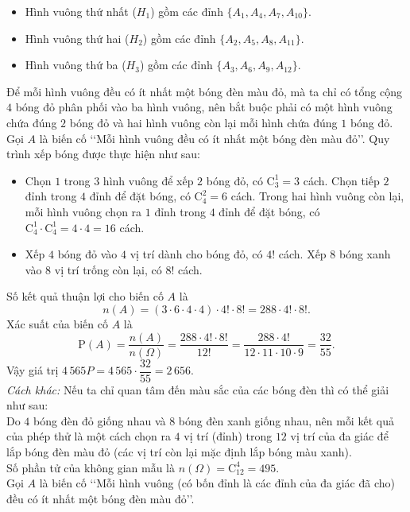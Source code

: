 \begin{ex}
{\begin{itemize}
			\item Hình vuông thứ nhất ($H_1$) gồm các đỉnh $\{A_1, A_4, A_7, A_{10}\}$.
			\item Hình vuông thứ hai ($H_2$) gồm các đỉnh $\{A_2, A_5, A_8, A_{11}\}$.
			\item Hình vuông thứ ba ($H_3$) gồm các đỉnh $\{A_3, A_6, A_9, A_{12}\}$.
		\end{itemize}
		Để mỗi hình vuông đều có ít nhất một bóng đèn màu đỏ, mà ta chỉ có tổng cộng $4$ bóng đỏ phân phối vào ba hình vuông, nên bắt buộc phải có một hình vuông chứa đúng $2$ bóng đỏ và hai hình vuông còn lại mỗi hình chứa đúng $1$ bóng đỏ.\\
		Gọi $A$ là biến cố \lq\lq Mỗi hình vuông đều có ít nhất một bóng đèn màu đỏ\rq\rq. Quy trình xếp bóng được thực hiện như sau:
		\begin{itemize}
			\item {}
			Chọn $1$ trong $3$ hình vuông để xếp $2$ bóng đỏ, có $\mathrm{C}_3^1 = 3$ cách. Chọn tiếp $2$ đỉnh trong $4$ đỉnh để đặt bóng, có $\mathrm{C}_4^2 = 6$ cách. Trong hai hình vuông còn lại, mỗi hình vuông chọn ra $1$ đỉnh trong $4$ đỉnh để đặt bóng, có $\mathrm{C}_4^1 \cdot \mathrm{C}_4^1 = 4 \cdot 4 = 16$ cách.
			\item {}
			Xếp $4$ bóng đỏ vào $4$ vị trí dành cho bóng đỏ, có $4!$ cách. Xếp $8$ bóng xanh vào $8$ vị trí trống còn lại, có $8!$ cách.
		\end{itemize}
		Số kết quả thuận lợi cho biến cố $A$ là
		\[ n(A) = (3 \cdot 6 \cdot 4\cdot 4)\cdot 4! \cdot 8! = 288 \cdot 4! \cdot 8!. \]
		Xác suất của biến cố $A$ là
		\[ \mathrm{P}(A) = \dfrac{n(A)}{n(\Omega)} = \dfrac{288 \cdot 4! \cdot 8!}{12!} = \dfrac{288 \cdot 4!}{12 \cdot 11 \cdot 10 \cdot 9} = \dfrac{32}{55}. \]
		Vậy giá trị $4\,565P = 4\,565 \cdot \dfrac{32}{55} = 2\,656$.\\
		\textit{Cách khác:} Nếu ta chỉ quan tâm đến màu sắc của các bóng đèn thì có thể giải như sau:\\
		Do $4$ bóng đèn đỏ giống nhau và $8$ bóng đèn xanh giống nhau, nên mỗi kết quả của phép thử là một cách chọn ra $4$ vị trí (đỉnh) trong $12$ vị trí của đa giác để lắp bóng đèn màu đỏ (các vị trí còn lại mặc định lắp bóng màu xanh). \\
		Số phần tử của không gian mẫu là $n(\Omega) = \mathrm{C}_{12}^4 = 495$.\\
		Gọi $A$ là biến cố \lq\lq Mỗi hình vuông (có bốn đỉnh là các đỉnh của đa giác đã cho) đều có ít nhất một bóng đèn màu đỏ\rq\rq.\\
}
\end{ex}
